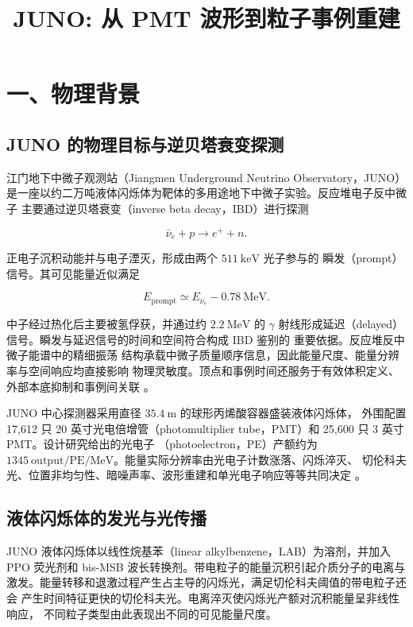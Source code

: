 \documentclass[UTF8,a4paper,11pt]{ctexart}
\title{JUNO: 从 PMT 波形到粒子事例重建}
\author{}
\date{}
\begin{document}
\pagestyle{plain}
\maketitle
\tableofcontents

\section{一、物理背景}

\subsection{JUNO 的物理目标与逆贝塔衰变探测}

江门地下中微子观测站（Jiangmen Underground Neutrino Observatory，JUNO）
是一座以约二万吨液体闪烁体为靶体的多用途地下中微子实验。反应堆电子反中微子
主要通过逆贝塔衰变（inverse beta decay，IBD）进行探测

\[
\bar\nu_e+p\longrightarrow e^++n.
\]

正电子沉积动能并与电子湮灭，形成由两个 \(511\ \mathrm{keV}\) 光子参与的
瞬发（prompt）信号。其可见能量近似满足

\[
E_{\mathrm{prompt}}\simeq E_{\bar\nu_e}-0.78\ \mathrm{MeV}.
\]

中子经过热化后主要被氢俘获，并通过约 \(2.2\ \mathrm{MeV}\) 的 \(\gamma\)
射线形成延迟（delayed）信号。瞬发与延迟信号的时间和空间符合构成 IBD 鉴别的
重要依据。反应堆反中微子能谱中的精细振荡
结构承载中微子质量顺序信息，因此能量尺度、能量分辨率与空间响应均直接影响
物理灵敏度。顶点和事例时间还服务于有效体积定义、外部本底抑制和事例间关联
\cite{juno2022,huang2023joint}。

JUNO 中心探测器采用直径 \(35.4\ \mathrm{m}\) 的球形丙烯酸容器盛装液体闪烁体，
外围配置 17,612 只 20 英寸光电倍增管（photomultiplier tube，PMT）和 25,600 只
3 英寸 PMT。设计研究给出的光电子
（photoelectron，PE）产额约为 \(1345\ \mathrm{output/PE/MeV}\)。能量实际分辨率由光电子计数涨落、闪烁淬灭、
切伦科夫光、位置非均匀性、暗噪声率、波形重建和单光电子响应等等共同决定
\cite{juno2025resolution}。

\subsection{液体闪烁体的发光与光传播}

JUNO 液体闪烁体以线性烷基苯（linear alkylbenzene，LAB）为溶剂，并加入
PPO 荧光剂和 bis-MSB 波长转换剂。带电粒子的能量沉积引起介质分子的电离与
激发。能量转移和退激过程产生占主导的闪烁光，满足切伦科夫阈值的带电粒子还会
产生时间特征更快的切伦科夫光。电离淬灭使闪烁光产额对沉积能量呈非线性响应，
不同粒子类型由此表现出不同的可见能量尺度。
\end{document}
